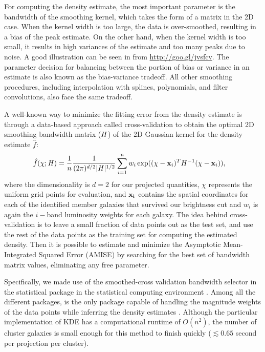 For computing the density estimate, the most important parameter  
is the bandwidth of the smoothing kernel, 
which takes the form of a matrix in the 2D case. 
When the kernel width is
too large, the data is over-smoothed, 
resulting in a bias of the peak estimate. On the other hand, when the kernel
width is too small, it results in high variances of the estimate and 
too many peaks due to noise. 
A good illustration can be seen in \citealt{Vanderplas2012} from 
\href{http://www.astroml.org/book\_figures/chapter6/fig\_hist\_to\_kernel.html}{http://goo.gl/jvsfcv}.
The parameter decision for balancing between the portion of
bias or variance in an estimate is also known as the bias-variance tradeoff. 
All other smoothing procedures, including interpolation with splines,
polynomials, and filter convolutions, also face the same tradeoff. 

A well-known way to minimize the fitting error from the density estimate is through
a data-based approach called cross-validation to obtain 
the optimal 2D smoothing
bandwidth matrix ($\mathbf{\it H}$) of the 2D Gaussian kernel for the
density estimate $\hat{f}$:
\begin{align}
	\hat{f}(\chi; \mathbf{\it H}) &= \frac{1}{n} \frac{1}{(2\pi)^{d/2}|\mathbf{\it H}|^{1/2}}
	\sum_{i=1}^n w_i \exp((\chi-{\bf x}_i)^T H^{-1} (\chi-{\bf x}_i)),
	\label{eq:cross_validated_bandwidth}
\end{align}
where the dimensionality is $d=2$ for our projected quantities,
$\chi$ represents the uniform grid points for evaluation, and 
$\bf{x}_i$ contains the spatial coordinates for each of the identified member 
galaxies that survived our brightness cut and $w_i$ is again the $i-$band
luminosity weights for each galaxy.
The idea behind cross-validation is to leave a small fraction of data points 
out as the test set, and use the rest of the data points as 
the training set for computing the estimated density.
Then it is possible to estimate and minimize the Asymptotic Mean-Integrated Squared Error
(AMISE)  by searching
for the best set of bandwidth matrix values, eliminating any free parameter. 

Specifically, we made use of the smoothed-cross validation \citep{Hall1992} 
bandwidth selector in the statistical package {} \citep{Duong2007} 
in the {} statistical computing environment \citep{R_core}. 
Among all the different {} packages, {} is the
only package capable of handling the magnitude weights of the data points 
while inferring the density estimates \citep{Deng2011}. 
Although the particular implementation of KDE has a computational runtime of $O(n^2)$, 
the number of cluster galaxies is
small enough for this method to finish quickly ($\lesssim 0.65$ second per
projection per cluster). 

